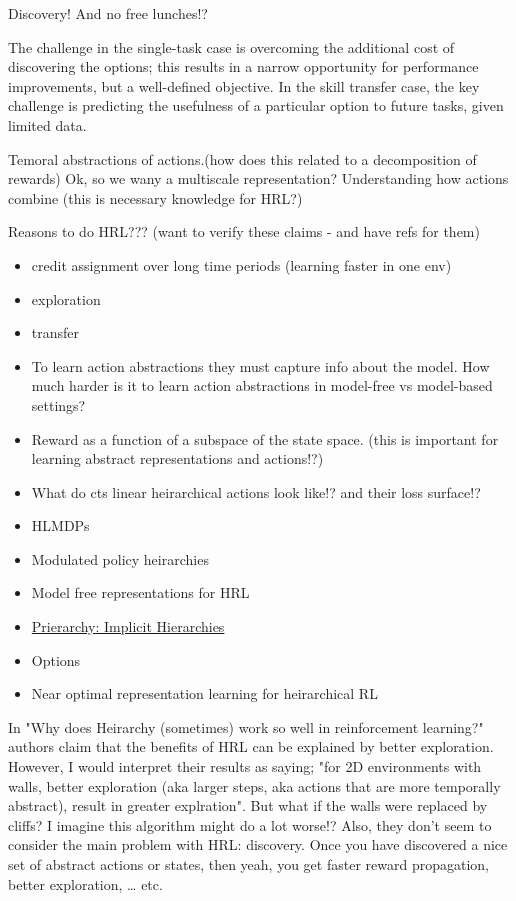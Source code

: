 Discovery! And no free lunches!?

\begin{displayquote}
  The challenge in the single-task case is overcoming the additional cost of discovering the options; this results in a narrow opportunity for performance improvements, but a well-defined objective. In the skill transfer case, the key challenge is predicting the usefulness of a particular option to future tasks, given limited data. \cite{Konidaris2019}
\end{displayquote}


Temoral abstractions of actions.(how does this related to a
decomposition of rewards) Ok, so we wany a multiscale representation?
Understanding how actions combine (this is necessary knowledge for HRL?)

Reasons to do HRL??? (want to verify these claims - and have refs for
them)

\begin{itemize}
\item
  credit assignment over long time periods (learning faster in one env)
\item
  exploration
\item
  transfer
\item
  To learn action abstractions they must capture info about the model.
  How much harder is it to learn action abstractions in model-free vs
  model-based settings?
\item
  Reward as a function of a subspace of the state space. (this is
  important for learning abstract representations and actions!?)
\item
  What do cts linear heirarchical actions look like!? and their loss
  surface!?
\item
  HLMDPs \cite{Saxea}
\item
  Modulated policy heirarchies \cite{Pashevich}
\item
  Model free representations for HRL \cite{Rafati}
\item
  \href{https://blog.aqnichol.com/2019/04/03/prierarchy-implicit-hierarchies/}{Prierarchy:
  Implicit Hierarchies}
\item
  Options
\item
  Near optimal representation learning for heirarchical RL \cite{Nachum2018}
\end{itemize}

In "Why does Heirarchy (sometimes) work so well in reinforcement learning?" \cite{Dadashi2018}
authors claim that the benefits of HRL can be explained by better
exploration. However, I would interpret their results as saying; "for
2D environments with walls, better exploration (aka larger steps, aka actions that are more temporally abstract), result in greater
explration". But what if the walls were replaced by cliffs? I imagine
this algorithm might do a lot worse!? Also, they don't seem to consider the main problem with HRL: discovery.
Once you have discovered a nice set of abstract actions or states, then yeah,
you get faster reward propagation, better exploration, \ldots{} etc.
